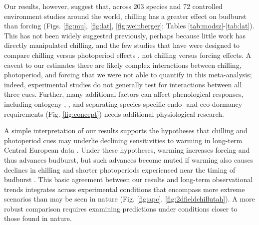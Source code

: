 \documentclass{article}
\begin{document}
Our results, however, suggest that, across 203 species and 72 controlled environment studies around the world, chilling has a greater effect on budburst than forcing (Figs. \ref{fig:mu}, \ref{fig:lat}, \ref{fig:weinberger}; Tables \ref{tab:modsz}-\ref{tab:lat}). This has not been widely suggested previously, perhaps because little work has directly manipulated chilling, and the few studies that have were designed to compare chilling versus photoperiod effects \emph{\citep[e.g.,][]{zohner2016,Basler:2014aa,Caffarra:2011qf,Laube:2014a}}, not chilling versus forcing effects.  A caveat to our estimates there are likely complex interactions between chilling, photoperiod, and forcing that we were not able to quantify in this meta-analysis; indeed, experimental studies do not generally test for interactions between all three cues. Further, many additional factors can affect phenological responses, including ontogeny \citep[Table S7,][]{vitasse2013}, , and separating species-specific endo- and eco-dormancy requirements (Fig. \ref{fig:concept}) needs additional physiological research. 

\par A simple interpretation of our results supports the hypotheses that chilling and photoperiod cues may underlie declining sensitivities to warming in long-term Central European data \emph{\citep{fu2015,Rutishauser:2008,yu2010}}. Under these hypotheses, warming increases forcing and thus advances budburst, but such advances become muted if warming also causes declines in chilling and shorter photoperiods experienced near the timing of budburst 
\emph{\citep{koerner2010a}}.
This basic agreement between our results and long-term observational trends integrates across experimental conditions that encompass more extreme scenarios than may be seen in nature (Fig. \ref{fig:apc}, \ref{fig:2dfieldchillutah}). A more robust comparison requires examining predictions under conditions closer to those found in nature.

\end{document}
